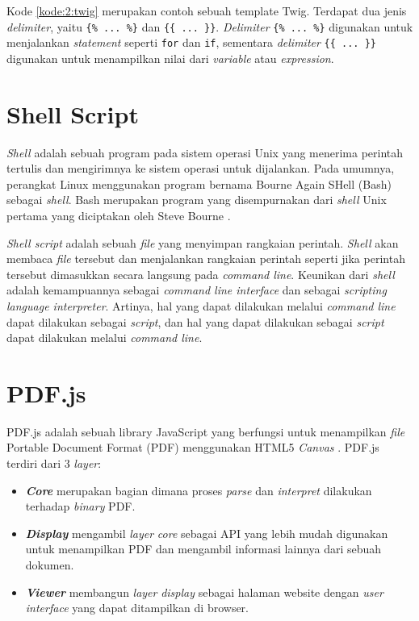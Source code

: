 Kode \ref{kode:2:twig} merupakan contoh sebuah template Twig. Terdapat dua jenis \textit{delimiter}, yaitu \verb|{% ... %}| dan \verb|{{ ... }}|. \textit{Delimiter} \verb|{% ... %}| digunakan untuk menjalankan \textit{statement} seperti \verb|for| dan \verb|if|, sementara \textit{delimiter} \verb|{{ ... }}| digunakan untuk menampilkan nilai dari \textit{variable} atau \textit{expression}.

\section{Shell Script}
\label{sec:2:shell}
\textit{Shell} adalah sebuah program pada sistem operasi Unix yang menerima perintah tertulis dan mengirimnya ke sistem operasi untuk dijalankan. Pada umumnya, perangkat Linux menggunakan program bernama Bourne Again SHell (Bash) sebagai \textit{shell}. Bash merupakan program yang disempurnakan dari \textit{shell} Unix pertama yang diciptakan oleh Steve Bourne \cite{linux}. 

\textit{Shell script} adalah sebuah \textit{file} yang menyimpan rangkaian perintah. \textit{Shell} akan membaca \textit{file} tersebut dan menjalankan rangkaian perintah seperti jika perintah tersebut dimasukkan secara langsung pada \textit{command line}. Keunikan dari \textit{shell} adalah kemampuannya sebagai \textit{command line interface} dan sebagai  \textit{scripting language interpreter}. Artinya, hal yang dapat dilakukan melalui \textit{command line} dapat dilakukan sebagai \textit{script}, dan hal yang dapat dilakukan sebagai \textit{script} dapat dilakukan melalui \textit{command line}.

\section{PDF.js}
\label{sec:2:pdfjs} 
PDF.js adalah sebuah library JavaScript yang berfungsi untuk menampilkan \textit{file} Portable Document Format (PDF) menggunakan HTML5 \textit{Canvas} \cite{pdfjs}. PDF.js terdiri dari 3 \textit{layer}:

\begin{itemize}
	\item \textit{\textbf{Core}} merupakan bagian dimana proses \textit{parse} dan \textit{interpret} dilakukan terhadap \textit{binary} PDF.
	\item \textit{\textbf{Display}} mengambil \textit{layer} \textit{core} sebagai API yang lebih mudah digunakan untuk menampilkan PDF dan mengambil informasi lainnya dari sebuah dokumen.
	\item \textit{\textbf{Viewer}} membangun \textit{layer} \textit{display} sebagai halaman website dengan \textit{user interface} yang dapat ditampilkan di browser.
\end{itemize}

